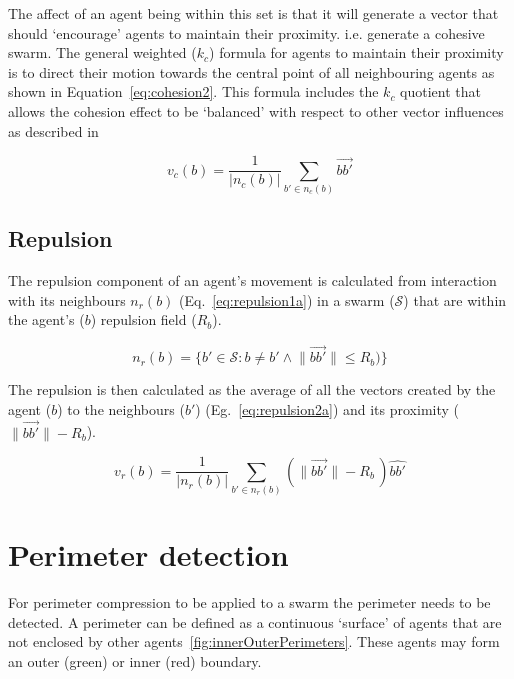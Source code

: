 \documentclass[12pt,a4paper]{IEEEtran}
\begin{document}
The affect of an agent being within this set is that it will generate a vector that should `encourage' agents to maintain their proximity. i.e. generate a cohesive swarm. The general weighted ($k_c$) formula for agents to maintain their proximity is to direct their motion towards the central point of all neighbouring agents as shown in Equation~\ref{eq:cohesion2}. This formula includes the $k_c$ quotient that allows the cohesion effect to be `balanced' with respect to other vector influences as described in ~\cite{eliot2017methods,eliot2018metric,eliot2019void} 

\begin{equation}\label{eq:cohesion2}
v_c(b) = \frac{1}{\lvert n_c(b)\rvert} \sum_{b' \in n_c(b)}\vec{b b'}
\end{equation}

\subsection{Repulsion}\label{repulsion:neighbours}
The repulsion component of an agent's movement is calculated from interaction with its neighbours $n_r(b)$ (Eq.~\ref{eq:repulsion1a}) in a swarm ($\mathcal{S}$) that are within the agent's ($b$) repulsion field ($R_b$).

\begin{equation}\label{eq:repulsion1a}
n_r(b) = \{b' \in \mathcal{S} : b \neq b' \land \lVert\vec{b b'}\rVert \leq R_b)\}
\end{equation}

The repulsion is then calculated as the average of all the vectors created by the agent ($b$) to the neighbours ($b'$) (Eg.~\ref{eq:repulsion2a}) and its proximity ($\lVert\vec{bb'}\rVert - R_b$).

\begin{equation}\label{eq:repulsion2a}
v_r(b) = \frac{1}{\lvert n_r(b)\rvert}\sum_{b' \in n_r(b)} \left(\lVert\vec{b b'}\rVert - R_b \, \right)\widehat{bb'}
\end{equation}

\section{Perimeter detection}\label{perimeterDetection}
For perimeter compression to be applied to a swarm the perimeter needs to be detected. A perimeter can be defined as a continuous `surface' of agents that are not enclosed by other agents~\ref{fig:innerOuterPerimeters}. These agents may form an outer ({\color{green}green}) or inner ({\color{red}red}) boundary.
\end{document}
